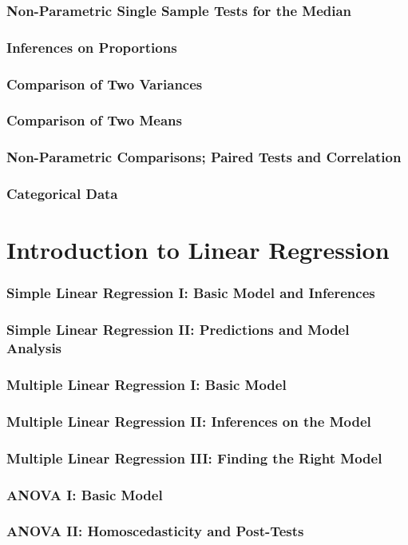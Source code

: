 \documentclass[11pt,a4paper]{article}
\begin{document}
\section{Non-Parametric Single Sample Tests for the Median}
\section{Inferences on Proportions}
\section{Comparison of Two Variances}
\section{Comparison of Two Means}
\section{Non-Parametric Comparisons; Paired Tests and Correlation}
\section{Categorical Data}

\newpage
\part{Introduction to Linear Regression}
\section{Simple Linear Regression I: Basic Model and Inferences}
\section{Simple Linear Regression II: Predictions and Model Analysis}
\section{Multiple Linear Regression I: Basic Model}
\section{Multiple Linear Regression II: Inferences on the Model}
\section{Multiple Linear Regression III: Finding the Right Model}
\section{ANOVA I: Basic Model}
\section{ANOVA II: Homoscedasticity and Post-Tests}
\end{document}
